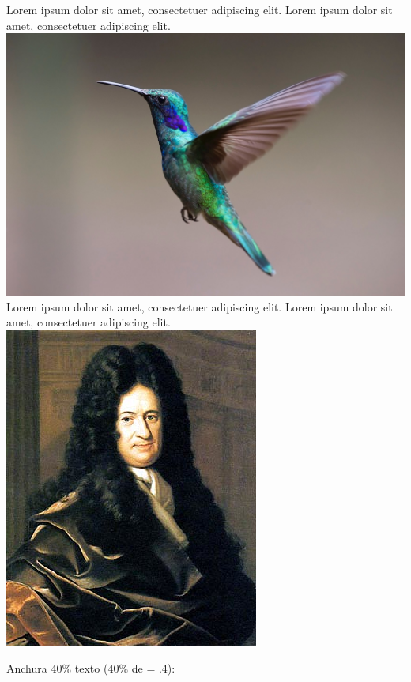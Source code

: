 \documentclass[12pt,a4paper,twoside]{article}
\begin{document}
\noindent Lorem ipsum dolor sit amet, consectetuer adipiscing elit. Lorem ipsum dolor sit amet, consectetuer adipiscing elit.\\
\noindent\includegraphics[scale=0.5]{images/bird.jpg}\\
\noindent Lorem ipsum dolor sit amet, consectetuer adipiscing elit. Lorem ipsum dolor sit amet, consectetuer adipiscing elit.\\
\noindent\includegraphics[scale=0.5]{images/GWLeibniz.png}

Anchura $40\%$ texto ($40\%$ de \the\dimexpr\textwidth\relax = \the\dimexpr .4\textwidth\relax):
\end{document}
